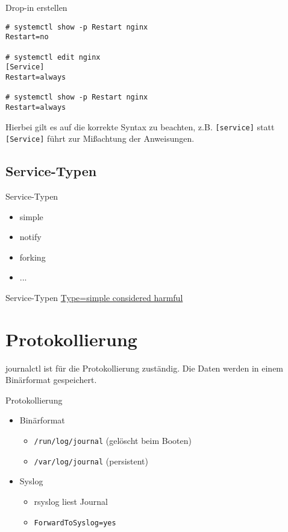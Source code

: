 \begin{frame}[fragile]{Drop-in erstellen}
	\begin{lstlisting}
# systemctl show -p Restart nginx
Restart=no

# systemctl edit nginx
[Service]
Restart=always

# systemctl show -p Restart nginx
Restart=always
\end{lstlisting}
\end{frame}

Hierbei gilt es auf die korrekte Syntax zu beachten, z.B. \verb|[service]| statt \verb|[Service]|
führt zur Mißachtung der Anweisungen.

\subsection{Service-Typen}

\begin{frame}{Service-Typen}
\begin{itemize}
\item simple
\item notify
\item forking
\item ...
\end{itemize}
\end{frame}

\begin{frame}{Service-Typen}
\href{https://www.lucas-nussbaum.net/blog/?p=877}{Type=simple considered harmful}
\end{frame}

\section{Protokollierung}

journalctl ist für die Protokollierung zuständig. Die Daten werden in einem Binärformat gespeichert.

\begin{frame}[fragile]{Protokollierung}
\begin{itemize}
\item Binärformat
\begin{itemize}
\item \verb|/run/log/journal| (gelöscht beim Booten)
\item \verb|/var/log/journal| (persistent)
\end{itemize}
\item Syslog
	\begin{itemize}
	\item rsyslog liest Journal
	\item \verb|ForwardToSyslog=yes|
	\end{itemize}
\end{itemize}
\end{frame}

